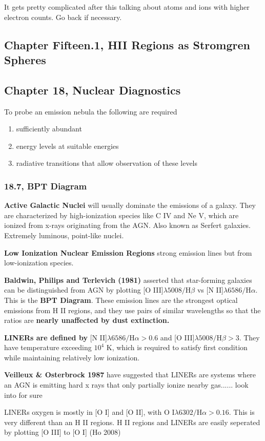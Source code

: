 It gets pretty complicated after this talking about atoms and ions with higher electron counts. Go back if necessary.




\subsection{Chapter Fifteen.1, HII Regions as Stromgren Spheres}
\subsection{Chapter 18, Nuclear Diagnostics}
To probe an emission nebula the following are required
\begin{enumerate}
  \item sufficiently abundant
  \item     energy levels at suitable energies
  \item radiative transitions that allow observation of these levels
\end{enumerate}

\subsubsection{18.7, BPT Diagram}

\textbf{Active Galactic Nuclei} will usually dominate the emissions of a galaxy. They are characterized by high-ionization species like C IV and Ne V, which are ionized from x-rays originating from the AGN\@. Also known as Serfert galaxies. Extremely luminous, point-like nuclei.


\textbf{Low Ionization Nuclear Emission Regions} strong emission lines but from low-ionization species.

\textbf{Baldwin, Philips and Terlevich (1981)} asserted that star-forming galaxies can be distinguished from AGN by plotting [O III]$ \lambda 5008 / \text{H}\beta $ vs [N II]$ \lambda 6586 / \text{H}\alpha $. This is the \textbf{BPT Diagram}. These emission lines are the strongest optical emissions from H II regions, and they use pairs of similar wavelengths so that the ratios are \textbf{nearly unaffected by dust extinction.}

\textbf{LINERs are defined by} [N II]$ \lambda 6586 / \text{H}\alpha > 0.6$ and [O III]$ \lambda 5008 / \text{H}\beta > 3$. They have temperature exceeding $ 10^{4} $ K, which is required to satisfy first condition while maintaining relatively low ionization.

\textbf{Veilleux & Osterbrock 1987} have suggested that LINERs are systems where an AGN is emitting hard x rays that only partially ionize nearby gas...... look into for sure

LINERs oxygen is mostly in [O I] and [O II], with $ \text{O I}\lambda 6302/\text{H}\alpha > 0.16$. This is very different than an H II regions. H II regions and LINERs are easily seperated by plotting [O III] to [O I] (Ho 2008)
